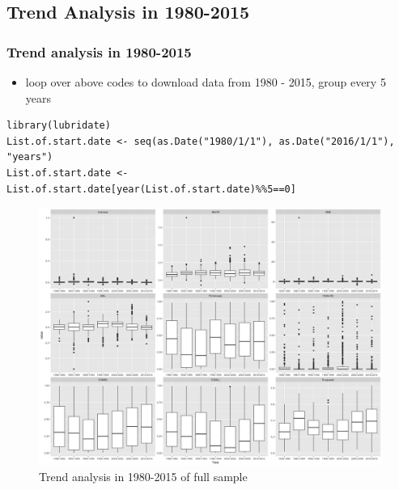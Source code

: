 \documentclass{beamer}
\begin{document}
\subsection{Trend Analysis in 1980-2015}
\begin{frame}[fragile]
\frametitle{Trend analysis in 1980-2015}
\begin{itemize}
\item loop over above codes to download data from 1980 - 2015, group every 5 years
\end{itemize}
\begin{lstlisting}
library(lubridate)
List.of.start.date <- seq(as.Date("1980/1/1"), as.Date("2016/1/1"), "years")
List.of.start.date <- List.of.start.date[year(List.of.start.date)%%5==0]
\end{lstlisting}


\end{frame}

\begin{frame}
\begin{figure}
\centering
\includegraphics[scale=.16]{2SP500-1980-2015.png}
\caption{Trend analysis in 1980-2015 of full sample}
\end{figure}
\end{frame}
\end{document}
